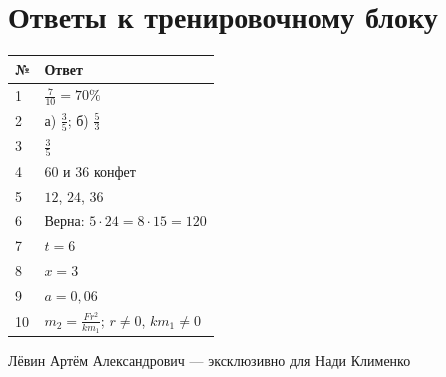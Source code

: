 \documentclass[a4paper,12pt]{article}
\begin{document}
\section*{Ответы к тренировочному блоку}
\vspace{4mm}
\renewcommand{\arraystretch}{1.55}
\begin{tabularx}{\linewidth}{@{}p{16mm}X@{}}
\toprule
\textcolor{darkaccent}{№} & \textcolor{darkaccent}{Ответ}\\
\midrule
1 & $\frac7{10}=70\%$\\
2 & а) $\frac35$; б) $\frac53$\\
3 & $\frac35$\\
4 & $60$ и $36$ конфет\\
5 & $12$, $24$, $36$\\
6 & Верна: $5\cdot24=8\cdot15=120$\\
7 & $t=6$\\
8 & $x=3$\\
9 & $a=0{,}06$\\
10 & $\displaystyle m_2=\frac{Fr^2}{km_1}$; $r\ne0$, $km_1\ne0$\\
\bottomrule
\end{tabularx}

\vfill
\begin{center}
{\color{darkaccent}\small Лёвин Артём Александрович --- эксклюзивно для Нади Клименко}
\end{center}
\end{document}
